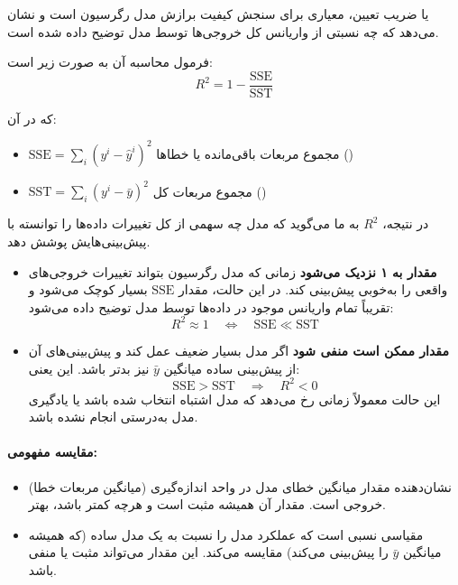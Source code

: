 

 یا ضریب تعیین، معیاری برای سنجش کیفیت برازش مدل رگرسیون است و نشان می‌دهد که چه نسبتی از واریانس کل خروجی‌ها توسط مدل توضیح داده شده است.

فرمول محاسبه آن به صورت زیر است:
\[
R^2 = 1 - \frac{\text{SSE}}{\text{SST}}
\]

که در آن:
\begin{itemize}
	\item $\text{SSE} = \sum_i (y^i - \hat{y}^i)^2$ \quad مجموع مربعات باقی‌مانده یا خطاها ()
	\item $\text{SST} = \sum_i (y^i - \bar{y})^2$ \quad مجموع مربعات کل ()
\end{itemize}

در نتیجه، $R^2$ به ما می‌گوید که مدل چه سهمی از کل تغییرات داده‌ها را توانسته با پیش‌بینی‌هایش پوشش دهد.



\begin{itemize}
	\item \textbf{مقدار  به ۱ نزدیک می‌شود} زمانی که مدل رگرسیون بتواند تغییرات خروجی‌های واقعی را به‌خوبی پیش‌بینی کند. در این حالت، مقدار $\text{SSE}$ بسیار کوچک می‌شود و تقریباً تمام واریانس موجود در داده‌ها توسط مدل توضیح داده می‌شود:
	\[
	R^2 \approx 1 \quad \Leftrightarrow \quad \text{SSE} \ll \text{SST}
	\]
	
	\item \textbf{مقدار  ممکن است منفی شود} اگر مدل بسیار ضعیف عمل کند و پیش‌بینی‌های آن از پیش‌بینی ساده میانگین $\bar{y}$ نیز بدتر باشد. این یعنی:
	\[
	\text{SSE} > \text{SST} \quad \Rightarrow \quad R^2 < 0
	\]
	این حالت معمولاً زمانی رخ می‌دهد که مدل اشتباه انتخاب شده باشد یا یادگیری مدل به‌درستی انجام نشده باشد.
\end{itemize}

\pagebreak



\paragraph{مقایسه مفهومی:}
\begin{itemize}
	\item {} (میانگین مربعات خطا) نشان‌دهنده مقدار میانگین خطای مدل در واحد اندازه‌گیری خروجی است. مقدار آن همیشه مثبت است و هرچه کمتر باشد، بهتر.
	\item {} مقیاسی نسبی است که عملکرد مدل را نسبت به یک مدل ساده (که همیشه میانگین $\bar{y}$ را پیش‌بینی می‌کند) مقایسه می‌کند. این مقدار می‌تواند مثبت یا منفی باشد.
\end{itemize}

